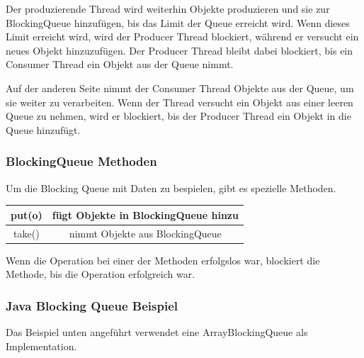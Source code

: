 Der produzierende Thread wird weiterhin Objekte produzieren und sie zur BlockingQueue hinzufügen, bis das Limit der Queue erreicht wird. Wenn dieses Limit erreicht wird, wird der Producer Thread blockiert, während er versucht ein neues Objekt hinzuzufügen.  Der Producer Thread bleibt dabei blockiert, bis ein Consumer Thread ein Objekt aus der Queue nimmt. 

Auf der anderen Seite nimmt der Consumer Thread Objekte aus der Queue, um sie weiter zu verarbeiten.  Wenn der Thread versucht ein Objekt aus einer leeren Queue zu nehmen, wird er blockiert, bis der Producer Thread ein Objekt in die Queue hinzufügt. 

\subsubsection{BlockingQueue Methoden}
Um die Blocking Queue mit Daten zu bespielen, gibt es spezielle Methoden. 

\begin{center}
    \begin{tabular}{ |c|c| } 
     \hline
     put(o) & fügt Objekte in BlockingQueue hinzu \\ 
     \hline
     take() & nimmt Objekte aus BlockingQueue \\ 
     \hline
    \end{tabular}
    \end{center}

Wenn die Operation bei einer der Methoden erfolgslos war, blockiert die Methode, bis die Operation erfolgreich war. 

\subsubsection{Java Blocking Queue Beispiel}
Das Beispiel unten angeführt verwendet eine ArrayBlockingQueue als Implementation. 




